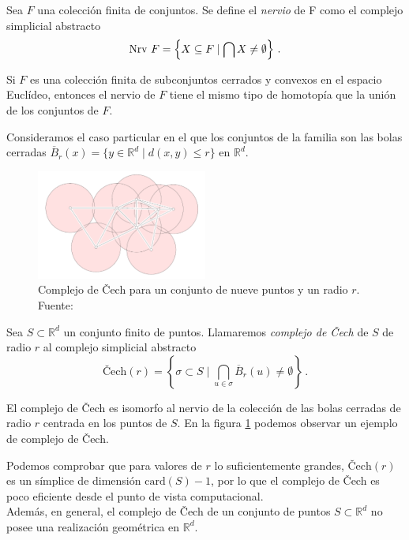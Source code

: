 \begin{definition}
Sea $F$ una colección finita de conjuntos. Se define el \emph{nervio} de F como el complejo simplicial abstracto
\[
{\rm Nrv}\ F= \left\{ X \subseteq F \mid \bigcap X \neq \emptyset \right\}\,.
\]
\end{definition}

\begin{lemma}
Si $F$ es una colección finita de subconjuntos cerrados y convexos en el espacio Euclídeo, entonces el nervio de $F$ tiene el mismo tipo de homotopía que la unión de los conjuntos de $F$.
\end{lemma}

Consideramos el caso particular en el que los conjuntos de la familia son las bolas cerradas $\overline{B}_r(x)= \{y\in \mathbb{R}^d \mid d(x,y) \leq r\}$ en $\mathbb{R}^d$.

\begin{figure}[!ht]
\centering
\includegraphics[width=0.5\textwidth]{include/figuras/Cech.png} 
\caption{Complejo de \v{C}ech para un conjunto de nueve puntos y un radio $r$. Fuente: \cite{libroEH}}
\label{ref:cech}
\end{figure}

\begin{definition}
Sea $S\subset \mathbb{R}^d$ un conjunto finito de puntos. Llamaremos \emph{complejo de \v{C}ech} de $S$ de radio $r$ al complejo simplicial abstracto
\[
\text{\v{C}ech}(r)=\left\{\sigma \subset S \mid \bigcap_{u \in \sigma} \overline{B}_r(u)\neq \emptyset \right\}\,.
\]
\end{definition}

El complejo de \v{C}ech es isomorfo al nervio de la colección de las bolas cerradas de radio $r$ centrada en los puntos de $S$. En la figura \ref{ref:cech} podemos observar un ejemplo de complejo de \v{C}ech.

Podemos comprobar \cite{libroEH} que para valores de $r$ lo suficientemente grandes, $\text{\v{C}ech}(r)$ es un símplice de dimensión $\text{card}(S)-1$, por lo que el complejo de \v{C}ech es poco eficiente desde el punto de vista computacional.\\
Además, en general, el complejo de \v{C}ech de un conjunto de puntos $S \subset \mathbb{R}^d$ no posee una realización geométrica en $\mathbb{R}^d$.




